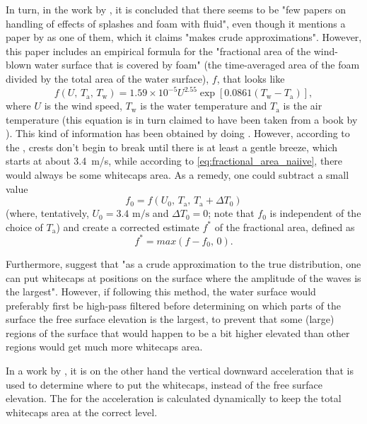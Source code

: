 In turn, in the work by \citet{Takahashi2003}, it is concluded that there seems to be "few papers on handling of effects of splashes and foam with fluid", even though it mentions a paper by \citet{Premovze2001} as one of them, which it claims "makes crude approximations". However, this paper includes an empirical formula for the "fractional area of the wind-blown water surface that is covered by foam" (the time-averaged area of the foam divided by the total area of the water surface), $f$, that looks like
%
\begin{equation} \label{eq:fractional_area_naiive}
f(U,\, T_{\text{a}},\, T_{\text{w}}) = 1.59 \times 10^{-5}U^{2.55}\exp[0.0861(T_{\text{w}} - T_{\text{a}})],
\end{equation}
%
where $U$ is the wind speed, $T_{\text{w}}$ is the water temperature and $T_{\text{a}}$ is the air temperature (this equation is in turn claimed to have been taken from a book by \citet{Monahan1986}). This kind of information has been obtained by doing . However, according to the , crests don't begin to break until there is at least a gentle breeze, which starts at about \mbox{3.4 m/s}, while according to \eqref{eq:fractional_area_naiive}, there would always be some whitecaps area. As a remedy, one could subtract a small value
%
\begin{equation}
f_0 = f(U_0,\, T_{\text{a}},\, T_{\text{a}}+\Delta T_0)
\end{equation}
%
(where, tentatively, ${U_0 = 3.4\text{ m/s}}$ and ${\Delta T_0 = 0}$; note that $f_0$ is independent of the choice of $T_{\text{a}}$) and create a corrected estimate $f^*$ of the fractional area, defined as
%
\begin{equation}
f^* = max(f-f_0,\,0).
\end{equation}

Furthermore, \citeauthor{Premovze2001} suggest that "as a crude approximation to the true distribution, one can put whitecaps at positions on the surface where the amplitude of the waves is the largest". However, if following this method, the water surface would preferably first be high-pass filtered before determining on which parts of the surface the free surface elevation is the largest, to prevent that some (large) regions of the surface that would happen to be a bit higher elevated than other regions would get much more whitecaps area.

In a work by \citet{Monnier}, it is on the other hand the vertical downward acceleration that is used to determine where to put the whitecaps, instead of the free surface elevation. The \threshold for the acceleration is calculated dynamically to keep the total whitecaps area at the correct level. 

